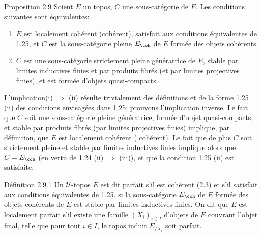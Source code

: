 \begin{enonce*}{Proposition 2.9}
Soient $E$ un topos, $C$ une sous-catégorie de $E$. Les conditions
suivantes sont équivalentes:
\begin{enumerate}
\renewcommand{\theenumi}{\roman{enumi}}
\renewcommand{\labelenumi}{(\theenumi)}
\item $E$ est localement cohérent (\resp cohérent), satisfait aux
  conditions équivalentes de \hyperref[VI.cor1.25]{1.25}, et $C$ est la sous-catégorie
  pleine $E_{\coh}$ de $E$ formée des objets cohérents.

\item $C$ est une sous-catégorie strictement pleine génératrice de
  $E$, stable par limites inductives finies et par produits fibrés
  (\resp et par limites projectives finies), et est formée d'objets
  quasi-compacts.
\end{enumerate}
\end{enonce*}

L'implication\pageoriginale (i) $\Rightarrow$ (ii) résulte trivialement des
définitions et de la forme \hyperref[VI.cor1.25]{1.25} (ii) des conditions envisagées dans
\hyperref[VI.cor1.25]{1.25}; prouvons l'implication inverse. Le fait que $C$ soit une
sous-catégorie pleine génératrice, formée d'objet quasi-compacts, et
stable par produits fibrés (\resp par limites projectives finies)
implique, par définition, que $E$ est localement cohérent (\resp
cohérent). Le fait que de plus $C$ soit strictement pleine et stable
par limites inductives finies implique alors que $C = E_{\coh}$ (en
vertu de \hyperref[VI.cor1.24]{1.24} (ii) $\Rightarrow$ (iii)), et que la condition \hyperref[VI.cor1.25]{1.25}
(ii) est satisfaite, \cqfd

\begin{enonce*}{Définition 2.9.1}
Un $𝒰$-topos $E$ est dit parfait s'il est cohérent (\hyperref[VI.def2.3]{2.3}) et s'il
satisfait aux conditions équivalentes de \hyperref[VI.cor1.25]{1.25}. \ie si la
sous-catégorie $E_{\coh}$ de $E$ formée des objets cohérents de $E$ est
stable par limites inductives finies. On dit que $E$ est localement
parfait s'il existe une famille $(X_i)_{i \in I}$ d'objets de $E$
couvrant l'objet final, telle que pour tout $i \in I$, le topos induit
$E_{/X_i}$ soit parfait.
\end{enonce*}

\setcounter{subsection}{9}
\setcounter{subsubsection}{1}
\subsubsection{}

